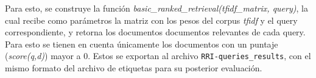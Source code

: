 Para esto, se construye la función \textit{basic\_ranked\_retrieval(tfidf\_matrix, query)}, la cual recibe como parámetros la matriz con los pesos del corpus \textit{tfidf} y el query correspondiente, y retorna los documentos documentos relevantes de cada query. Para esto se tienen en cuenta únicamente los documentos con un puntaje (\textit{score(q,d)}) mayor a 0. Estos se exportan al archivo \texttt{RRI-queries\_results}, con el mismo formato del archivo de etiquetas para su posterior evaluación.